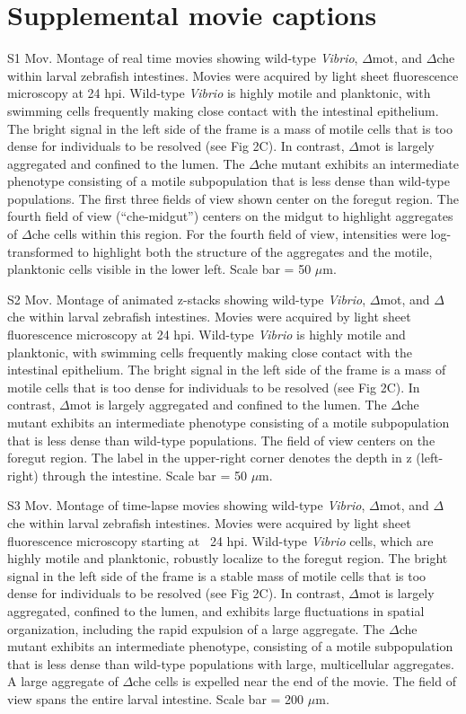 \newpage

\section{Supplemental movie captions}

S1 Mov. Montage of real time movies showing wild-type \textit{Vibrio}, $\Delta$mot, and $\Delta$che within larval zebrafish intestines. 
Movies were acquired by light sheet fluorescence microscopy at 24 hpi. Wild-type \textit{Vibrio} is highly motile and planktonic, with swimming cells frequently making close contact with the intestinal epithelium. The bright signal in the left side of the frame is a mass of motile cells that is too dense for individuals to be resolved (see Fig 2C). In contrast, $\Delta$mot is largely aggregated and confined to the lumen. The $\Delta$che mutant exhibits an intermediate phenotype consisting of a motile subpopulation that is less dense than wild-type populations. The first three fields of view shown center on the foregut region. The fourth field of view (``che-midgut'') centers on the midgut to highlight aggregates of $\Delta$che cells within this region. For the fourth field of view, intensities were log-transformed to highlight both the structure of the aggregates and the motile, planktonic cells visible in the lower left. Scale bar = 50 $\mu$m. 

S2 Mov. Montage of animated z-stacks showing wild-type \textit{Vibrio}, $\Delta$mot, and $\Delta$che within larval zebrafish intestines. 
Movies were acquired by light sheet fluorescence microscopy at 24 hpi. Wild-type \textit{Vibrio} is highly motile and planktonic, with swimming cells frequently making close contact with the intestinal epithelium. The bright signal in the left side of the frame is a mass of motile cells that is too dense for individuals to be resolved (see Fig 2C). In contrast, $\Delta$mot is largely aggregated and confined to the lumen. The $\Delta$che mutant exhibits an intermediate phenotype consisting of a motile subpopulation that is less dense than wild-type populations. The field of view centers on the foregut region. The label in the upper-right corner denotes the depth in z (left-right) through the intestine. Scale bar = 50 $\mu$m. 

S3 Mov. Montage of time-lapse movies showing wild-type \textit{Vibrio}, $\Delta$mot, and $\Delta$che within larval zebrafish intestines. 
Movies were acquired by light sheet fluorescence microscopy starting at ~24 hpi. Wild-type \textit{Vibrio} cells, which are highly motile and planktonic, robustly localize to the foregut region. The bright signal in the left side of the frame is a stable mass of motile cells that is too dense for individuals to be resolved (see Fig 2C). In contrast, $\Delta$mot is largely aggregated, confined to the lumen, and exhibits large fluctuations in spatial organization, including the rapid expulsion of a large aggregate. The $\Delta$che mutant exhibits an intermediate phenotype, consisting of a motile subpopulation that is less dense than wild-type populations with large, multicellular aggregates. A large aggregate of $\Delta$che cells is expelled near the end of the movie. The field of view spans the entire larval intestine. Scale bar = 200 $\mu$m. 

